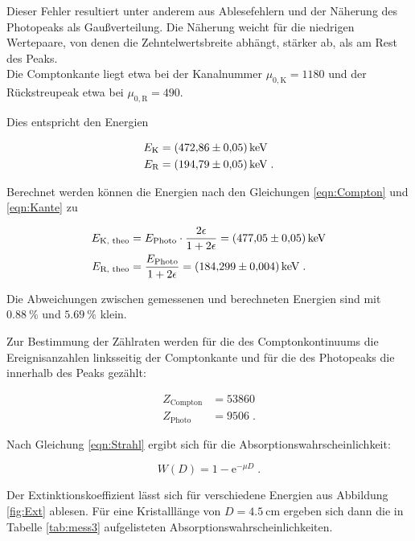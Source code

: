 Dieser Fehler resultiert unter anderem aus Ablesefehlern und der Näherung des Photopeaks als Gaußverteilung.
Die Näherung weicht für die niedrigen Wertepaare, von denen die Zehntelwertsbreite abhängt, stärker ab, als am Rest des Peaks. \\

Die Comptonkante liegt etwa bei der Kanalnummer $\mu_{0,\text{K}} = \num{1180}$ und der Rückstreupeak etwa bei
$\mu_{0, \text{R}} = \num{490}$.

Dies entspricht den Energien

\begin{align*}
  E_\text{K} &= \SI{472.86 +- 0.05}{\kilo\eV} \\
  E_\text{R} &= \SI{194.79 +- 0.05}{\kilo\eV} \; .
\end{align*}

Berechnet werden können die Energien nach den Gleichungen \eqref{eqn:Compton} und \eqref{eqn:Kante} zu

\begin{align*}
  E_\text{K, theo} &= E_\text{Photo} \cdot \frac{2 \epsilon}{1 + 2 \epsilon} = \SI{477.05 +- 0.05}{\kilo\eV} \\
  E_\text{R, theo} &= \frac{E_\text{Photo}}{1 + 2 \epsilon} =\SI{184.299 +- 0.004}{\kilo\eV} \; .
\end{align*}

Die Abweichungen zwischen gemessenen und berechneten Energien sind mit $\SI{0.88}{\percent}$ und $\SI{5.69}{\percent}$ klein. 

Zur Bestimmung der Zählraten werden für die des Comptonkontinuums die Ereignisanzahlen linksseitig der Comptonkante
und für die des Photopeaks die innerhalb des Peaks gezählt: 

\begin{align*}
  Z_\text{Compton} &= \num{53860} \\
  Z_\text{Photo} &= \num{9506} \; .
\end{align*}

Nach Gleichung \eqref{eqn:Strahl} ergibt sich für die Absorptionswahrscheinlichkeit:

\begin{equation}
  W(D) = 1 - \text{e}^{- \mu D} \; .
\end{equation}

Der Extinktionskoeffizient lässt sich für verschiedene Energien aus Abbildung \ref{fig:Ext} ablesen.
Für eine Kristalllänge von $D = \SI{4.5}{\centi\meter}$ ergeben sich dann die in Tabelle \ref{tab:mess3}
aufgelisteten Absorptionswahrscheinlichkeiten.

